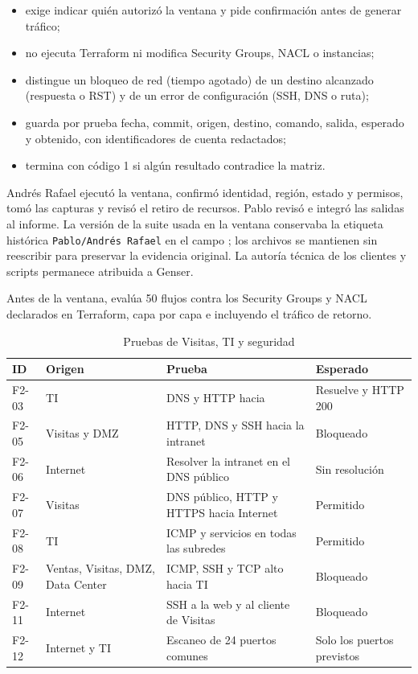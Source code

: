 \begin{itemize}
  \item exige indicar quién autorizó la ventana y pide confirmación antes de generar tráfico;
  \item no ejecuta Terraform ni modifica Security Groups, NACL o instancias;
  \item distingue un bloqueo de red (tiempo agotado) de un destino alcanzado (respuesta o RST)
    y de un error de configuración (SSH, DNS o ruta);
  \item guarda por prueba fecha, commit, origen, destino, comando, salida, esperado y obtenido,
    con identificadores de cuenta redactados;
  \item termina con código 1 si algún resultado contradice la matriz.
\end{itemize}

Andrés Rafael ejecutó la ventana, confirmó identidad, región, estado y permisos, tomó las capturas y
revisó el retiro de recursos. Pablo revisó e integró las salidas al informe. La versión de la suite
usada en la ventana conservaba la etiqueta histórica \texttt{Pablo/Andr\'es Rafael} en el campo
; los archivos se mantienen sin reescribir para preservar la evidencia original.
La autoría técnica de los clientes y scripts permanece atribuida a Genser.

Antes de la ventana,  evalúa 50 flujos contra los Security
Groups y NACL declarados en Terraform, capa por capa e incluyendo el tráfico de retorno.

\begin{table}[H]
\centering
\caption{Pruebas de Visitas, TI y seguridad}
\small
\begin{tabularx}{\textwidth}{>{\raggedright\arraybackslash}p{1.4cm}p{2.5cm}p{5.2cm}Y}
\toprule
\textbf{ID} & \textbf{Origen} & \textbf{Prueba} & \textbf{Esperado} \\
\midrule
F2-03 & TI & DNS y HTTP hacia  & Resuelve y HTTP 200 \\
F2-05 & Visitas y DMZ & HTTP, DNS y SSH hacia la intranet & Bloqueado \\
F2-06 & Internet & Resolver la intranet en el DNS público & Sin resolución \\
F2-07 & Visitas & DNS público, HTTP y HTTPS hacia Internet & Permitido \\
F2-08 & TI & ICMP y servicios en todas las subredes & Permitido \\
F2-09 & Ventas, Visitas, DMZ, Data Center & ICMP, SSH y TCP alto hacia TI & Bloqueado \\
F2-11 & Internet & SSH a la web y al cliente de Visitas & Bloqueado \\
F2-12 & Internet y TI & Escaneo de 24 puertos comunes & Solo los puertos previstos \\
\bottomrule
\end{tabularx}
\end{table}

